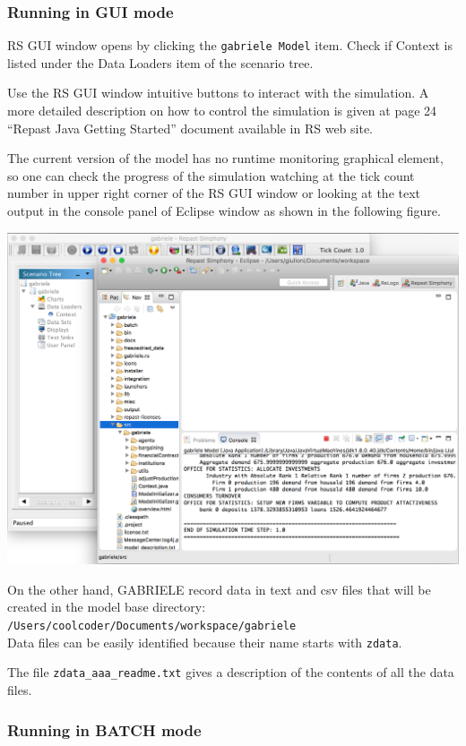 \documentclass{book}
\begin{document}
\subsubsection{Running in GUI mode}

RS GUI window opens by clicking the \verb+gabriele Model+ item. Check if Context is listed under the Data Loaders item of the scenario tree.

Use the RS GUI window intuitive buttons to interact with the simulation. A more detailed description on how to control the simulation is given at page 24 ``Repast Java Getting Started'' document available in RS web site.

The current version of the model has no runtime monitoring graphical element, so one can check the progress of the simulation watching at the tick count number in upper right corner of the RS GUI window or looking at the text output in the console panel of Eclipse window as shown in the following figure. 

\vskip2mm
\noindent
\includegraphics[scale=0.35]{fig_gabriele_rs_gui7}

\vskip2mm
On the other hand, GABRIELE record data in text and csv files that will be created in the model base directory:\\
\verb+/Users/coolcoder/Documents/workspace/gabriele+\\
Data files can be easily identified because their name starts with \verb+zdata+.

The file \verb+zdata_aaa_readme.txt+ gives a description of the contents of all the data files.

\subsubsection{Running in BATCH mode}
\end{document}
